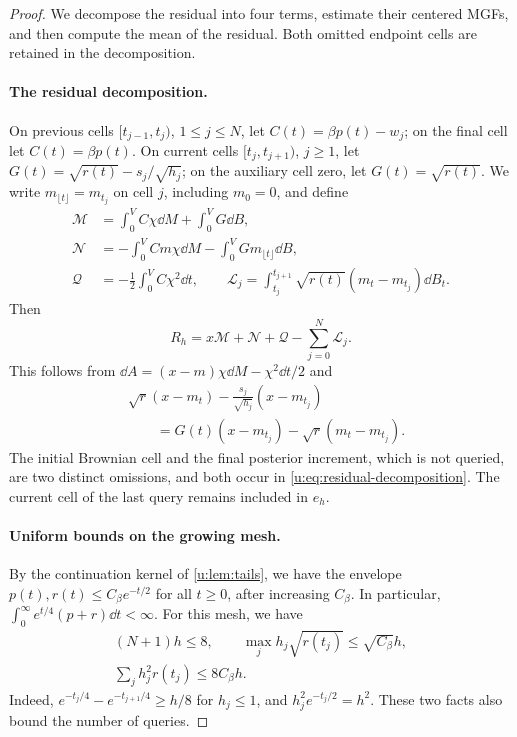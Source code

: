 \begin{proof}
We decompose the residual into four terms, estimate their centered MGFs, and then compute the mean of the residual. Both omitted endpoint cells are retained in the decomposition.

\paragraph{The residual decomposition.}
On previous cells $[t_{j-1},t_j)$, $1\le j\le N$, let $C(t)=\beta p(t)-w_j$; on the final cell let $C(t)=\beta p(t)$. On current cells $[t_j,t_{j+1})$, $j\ge1$, let $G(t)=\sqrt{r(t)}-s_j/\sqrt{h_j}$; on the auxiliary cell zero, let $G(t)=\sqrt{r(t)}$. We write $m_{\lfloor t\rfloor}=m_{t_j}$ on cell $j$, including $m_0=0$, and define
\begin{align*}
 \mathcal M&=\int_0^VC\chi\dd M+\int_0^VG\dd B,\\
 \mathcal N&=-\int_0^VCm\chi\dd M-
                  \int_0^VGm_{\lfloor t\rfloor}\dd B,\\
 \mathcal Q&=-\frac12\int_0^VC\chi^2\dd t,\qquad
 \mathscr L_j=\int_{t_j}^{t_{j+1}}\sqrt{r(t)}(m_t-m_{t_j})\dd B_t.
\end{align*}
Then
\begin{equation}\label{u:eq:residual-decomposition}
 R_h=x\mathcal M+\mathcal N+\mathcal Q-\sum_{j=0}^N\mathscr L_j.
\end{equation}
This follows from $\dd A=(x-m)\chi\dd M-\chi^2\dd t/2$ and
\[
\begin{aligned}
 &\sqrt r(x-m_t)-\frac{s_j}{\sqrt{h_j}}(x-m_{t_j})\\
 &\hspace{2em}=G(t)(x-m_{t_j})-\sqrt r(m_t-m_{t_j}).
\end{aligned}
\]
The initial Brownian cell and the final posterior increment, which is not queried, are two distinct omissions, and both occur in \eqref{u:eq:residual-decomposition}. The current cell of the last query remains included in $e_h$.

\paragraph{Uniform bounds on the growing mesh.}
By the continuation kernel of \cref{u:lem:tails}, we have the envelope $p(t),r(t)\le C_\beta e^{-t/2}$ for all $t\ge0$, after increasing $C_\beta$. In particular, $\int_0^\infty e^{t/4}(p+r)\dd t<\infty$. For this mesh, we have
\begin{equation}\label{u:eq:mesh-summability}
\begin{gathered}
 (N+1)h\le8,\qquad
 \max_jh_j\sqrt{r(t_j)}\le\sqrt{C_\beta}h,\\
 \sum_jh_j^2r(t_j)\le8C_\beta h.
\end{gathered}
\end{equation}
Indeed, $e^{-t_j/4}-e^{-t_{j+1}/4}\ge h/8$ for $h_j\le1$, and $h_j^2e^{-t_j/2}=h^2$. These two facts also bound the number of queries.


\end{proof}
